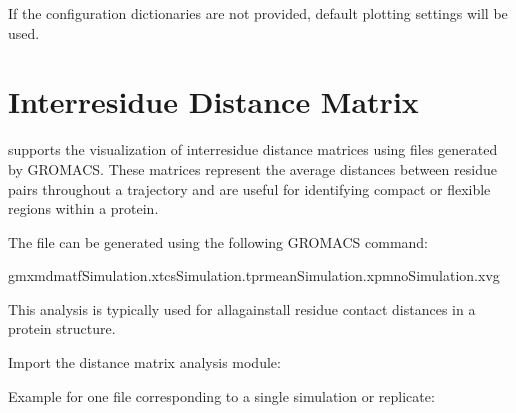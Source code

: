 \documentclass[a4paper,10pt,english]{sphinxmanual}
\begin{document}
\sphinxAtStartPar
If the configuration dictionaries are not provided, default plotting settings will be used.


\section{Inter\sphinxhyphen{}residue Distance Matrix}
\label{\detokenize{Input:inter-residue-distance-matrix}}
\sphinxAtStartPar
{} supports the visualization of inter\sphinxhyphen{}residue distance matrices using  files generated by GROMACS. These matrices represent the average distances between residue pairs throughout a trajectory and are useful for identifying compact or flexible regions within a protein.

\sphinxAtStartPar
The  file can be generated using the following GROMACS command:

\begin{sphinxVerbatim}[commandchars=\\\{\}]
gmxmdmat\PYGZhy{}fSimulation.xtc\PYGZhy{}sSimulation.tpr\PYGZhy{}meanSimulation.xpm\PYGZhy{}noSimulation.xvg
\end{sphinxVerbatim}

\sphinxAtStartPar
This analysis is typically used for all\sphinxhyphen{}against\sphinxhyphen{}all residue contact distances in a protein structure.

\sphinxAtStartPar
{}

\sphinxAtStartPar
Import the distance matrix analysis module:

\begin{sphinxVerbatim}[commandchars=\\\{\}]
 
\end{sphinxVerbatim}

\sphinxAtStartPar
Example for one  file corresponding to a single simulation or replicate:
\end{document}
